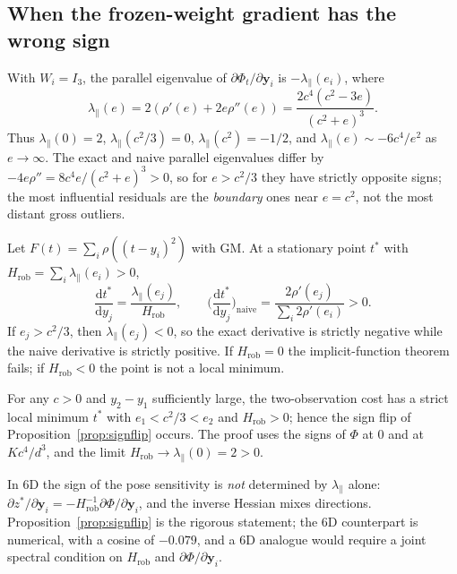 \subsection{When the frozen-weight gradient has the wrong sign}
\label{sec:signflip}

With $W_i=I_3$, the parallel eigenvalue of $\partial\Phi_t/\partial\mathbf{y}_i$ is
$-\lambda_\parallel(e_i)$, where
\begin{equation}
\lambda_\parallel(e)=2(\rho'(e)+2e\rho''(e))=\frac{2c^4(c^2-3e)}{(c^2+e)^3}.
\end{equation}
Thus $\lambda_\parallel(0)=2$, $\lambda_\parallel(c^2/3)=0$, $\lambda_\parallel(c^2)=-1/2$, and
$\lambda_\parallel(e)\sim-6c^4/e^2$ as $e\to\infty$. The exact and naive parallel eigenvalues differ
by $-4e\rho''=8c^4e/(c^2+e)^3>0$, so for $e>c^2/3$ they have strictly opposite signs; the most
influential residuals are the \emph{boundary} ones near $e=c^2$, not the most distant gross
outliers.

\begin{proposition}\label{prop:signflip}
Let $F(t)=\sum_i\rho((t-y_i)^2)$ with GM. At a stationary point $t^*$ with
$H_{\mathrm{rob}}=\sum_i\lambda_\parallel(e_i)>0$,
\begin{equation}
\frac{\mathrm{d}t^*}{\mathrm{d}y_j}=\frac{\lambda_\parallel(e_j)}{H_{\mathrm{rob}}},
\qquad
\Big(\frac{\mathrm{d}t^*}{\mathrm{d}y_j}\Big)_{\mathrm{naive}}
=\frac{2\rho'(e_j)}{\sum_i2\rho'(e_i)}>0.
\end{equation}
If $e_j>c^2/3$, then $\lambda_\parallel(e_j)<0$, so the exact derivative is strictly negative while
the naive derivative is strictly positive. If $H_{\mathrm{rob}}=0$ the implicit-function theorem
fails; if $H_{\mathrm{rob}}<0$ the point is not a local minimum.
\end{proposition}

\begin{proposition}[existence]\label{prop:existence}
For any $c>0$ and $y_2-y_1$ sufficiently large, the two-observation cost has a strict local minimum
$t^*$ with $e_1<c^2/3<e_2$ and $H_{\mathrm{rob}}>0$; hence the sign flip of
Proposition~\ref{prop:signflip} occurs. The proof uses the signs of $\Phi$ at $0$ and at $Kc^4/d^3$,
and the limit $H_{\mathrm{rob}}\to\lambda_\parallel(0)=2>0$.
\end{proposition}

In 6D the sign of the pose sensitivity is \emph{not} determined by $\lambda_\parallel$ alone:
$\partial z^*/\partial\mathbf{y}_i=-H_{\mathrm{rob}}^{-1}\partial\Phi/\partial\mathbf{y}_i$, and the
inverse Hessian mixes directions. Proposition~\ref{prop:signflip} is the rigorous statement; the 6D
counterpart is numerical, with a cosine of $-0.079$, and a 6D analogue would require a joint
spectral condition on $H_{\mathrm{rob}}$ and $\partial\Phi/\partial\mathbf{y}_i$.

